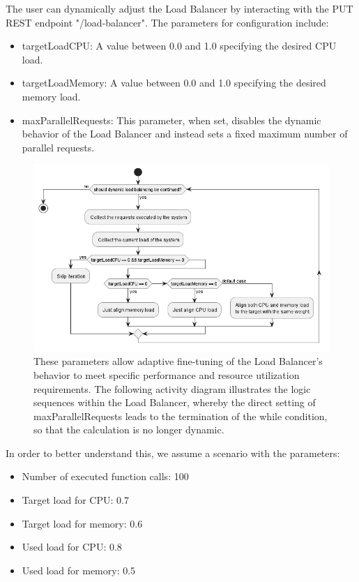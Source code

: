 The user can dynamically adjust the Load Balancer by interacting with the PUT REST endpoint "/load-balancer". The parameters for configuration include:

\begin{itemize}
\item targetLoadCPU: A value between 0.0 and 1.0 specifying the desired CPU load.
\item targetLoadMemory: A value between 0.0 and 1.0 specifying the desired memory load.
\item maxParallelRequests: This parameter, when set, disables the dynamic behavior of the Load Balancer and instead sets a fixed maximum number of parallel requests.
\end{itemize}

\begin{figure}
    \centering
    \includegraphics[width=\linewidth]{figures/profaastinate/load-balancer-schedule.png}
    \caption{These parameters allow adaptive fine-tuning of the Load Balancer's behavior to meet specific performance and resource utilization requirements. The following activity diagram illustrates the logic sequences within the Load Balancer, whereby the direct setting of maxParallelRequests leads to the termination of the while condition, so that the calculation is no longer dynamic.}
    \label{fig:og-profaastinate}
\end{figure}

In order to better understand this, we assume a scenario with the parameters:
\begin{itemize}
    \item Number of executed function calls: 100
    \item Target load for CPU: 0.7
    \item Target load for memory: 0.6
    \item Used load for CPU: 0.8
    \item Used load for memory: 0.5
\end{itemize}

